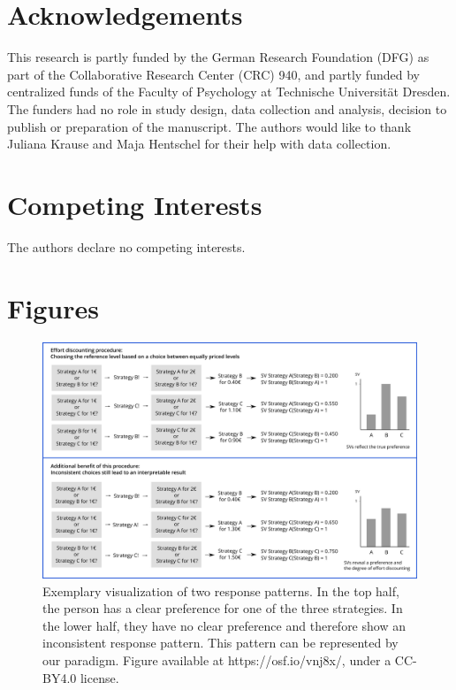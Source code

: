 \documentclass[
  man,floatsintext]{apa6}
\begin{document}
\endgroup

\newpage

\hypertarget{acknowledgements}{%
\section{Acknowledgements}\label{acknowledgements}}

This research is partly funded by the German Research Foundation (DFG) as part of the Collaborative Research Center (CRC) 940, and partly funded by centralized funds of the Faculty of Psychology at Technische Universität Dresden.
The funders had no role in study design, data collection and analysis, decision to publish or preparation of the manuscript.
The authors would like to thank Juliana Krause and Maja Hentschel for their help with data collection.

\hypertarget{competing-interests}{%
\section{Competing Interests}\label{competing-interests}}

The authors declare no competing interests.

\hypertarget{figures}{%
\section{Figures}\label{figures}}

\begin{figure}[H]
\includegraphics[width=\textwidth]{figures/Paradigm_Scheme_T2} \caption{Exemplary visualization of two response patterns. In the top half, the person has a clear preference for one of the three strategies. In the lower half, they have no clear preference and therefore show an inconsistent response pattern. This pattern can be represented by our paradigm. Figure available at https://osf.io/vnj8x/, under a CC-BY4.0 license.}\label{fig:ResponsePatterns}
\end{figure}
\end{document}
